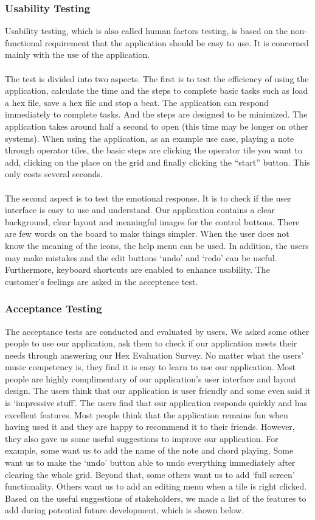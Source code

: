 \documentclass[10pt,a4paper]{article}
\begin{document}
\subsubsection{Usability Testing}
Usability testing, which is also called human factors testing, is based on the non-functional requirement that the application should be easy to use. It is concerned mainly with the use of the application.\\
\\
The test is divided into two aspects. The first is to test the efficiency of using the application, calculate the time and the steps to complete basic tasks such as load a hex file, save a hex file and stop a beat. The application can respond immediately to complete tasks. And the steps are designed to be minimized. The application takes around half a second to open (this time may be longer on other systems). When using the application, as an example use case, playing a note through operator tiles, the basic steps are clicking the operator tile you want to add, clicking on the place on the grid and finally clicking the “start” button. This only costs several seconds.\\
\\
The second aspect is to test the emotional response. It is to check if the user interface is easy to use and understand. Our application contains a clear background, clear layout and meaningful images for the control buttons. There are few words on the board to make things simpler. When the user does not know the meaning of the icons, the help menu can be used. In addition, the users may make mistakes and the edit buttons ‘undo’ and ‘redo’ can be useful. Furthermore, keyboard shortcuts are enabled to enhance usability. The customer's feelings are asked in the acceptence test. 

\subsubsection{Acceptance Testing}
The acceptance tests are conducted and evaluated by users. We asked some other people to use our application, ask them to check if our application meets their needs through answering our Hex Evaluation Survey. No matter what the users’ music competency is, they find it is easy to learn to use our application. Most people are highly complimentary of our application’s user interface and layout design. The users think that our application is user friendly and some even said it is ‘impressive stuff’\cite{edgeorge}. The users find that our application responds quickly and has excellent features. Most people think that the application remains fun when having used it and they are happy to recommend it to their friends. However, they also gave us some useful suggestions to improve our application. For example, some want us to add the name of the note and chord playing. Some want us to make the ‘undo’ button able to undo everything immediately after clearing the whole grid. Beyond that, some others want us to add ‘full screen’ functionality. Others want us to add an editing menu when a tile is right clicked. Based on the useful suggestions of stakeholders, we made a list of the features to add during potential future development, which is shown below.
\end{document}
